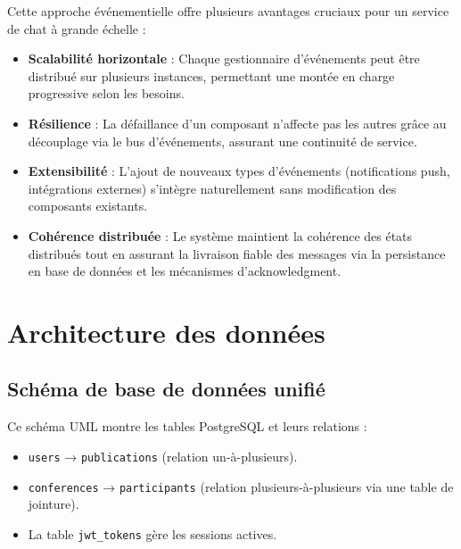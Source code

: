 \documentclass{rapportPfe}
\begin{document}
Cette approche événementielle offre plusieurs avantages cruciaux pour un service de chat à grande échelle :

\begin{itemize}
    \item \textbf{Scalabilité horizontale} : Chaque gestionnaire d'événements peut être distribué sur plusieurs instances, permettant une montée en charge progressive selon les besoins.
    
    \item \textbf{Résilience} : La défaillance d'un composant n'affecte pas les autres grâce au découplage via le bus d'événements, assurant une continuité de service.
    
    \item \textbf{Extensibilité} : L'ajout de nouveaux types d'événements (notifications push, intégrations externes) s'intègre naturellement sans modification des composants existants.
    
    \item \textbf{Cohérence distribuée} : Le système maintient la cohérence des états distribués tout en assurant la livraison fiable des messages via la persistance en base de données et les mécanismes d'acknowledgment.
\end{itemize}

\FloatBarrier

\section{Architecture des données}

\subsection{Schéma de base de données unifié}

Ce schéma UML montre les tables PostgreSQL et leurs relations :

\begin{itemize}
    \item \texttt{users} → \texttt{publications} (relation un-à-plusieurs).
    \item \texttt{conferences} → \texttt{participants} (relation plusieurs-à-plusieurs via une table de jointure).
    \item La table \texttt{jwt\_tokens} gère les sessions actives.
\end{itemize}
\end{document}
